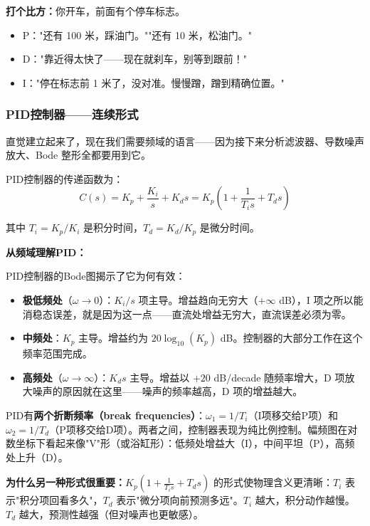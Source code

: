 \textbf{打个比方：}你开车，前面有个停车标志。
\begin{itemize}
    \item P："还有 100 米，踩油门。""还有 10 米，松油门。"
    \item D："靠近得太快了——现在就刹车，别等到跟前！"
    \item I："停在标志前 1 米了，没对准。慢慢蹭，蹭到精确位置。"
\end{itemize}

\subsubsection{PID控制器——连续形式}

直觉建立起来了，现在我们需要频域的语言——因为接下来分析滤波器、导数噪声放大、Bode 整形全都要用到它。

PID控制器的传递函数为：
\begin{equation}
C(s) = K_p + \frac{K_i}{s} + K_d s = K_p \left(1 + \frac{1}{T_i s} + T_d s\right)
\end{equation}

其中 $T_i = K_p / K_i$ 是积分时间，$T_d = K_d / K_p$ 是微分时间。

\textbf{从频域理解PID：}

PID控制器的Bode图揭示了它为何有效：
\begin{itemize}
    \item \textbf{极低频处}（$\omega \to 0$）：$K_i/s$ 项主导。增益趋向无穷大（$+\infty$ dB），I 项之所以能消稳态误差，就是因为这一点——直流处增益无穷大，直流误差必须为零。
    \item \textbf{中频处}：$K_p$ 主导。增益约为 $20\log_{10}(K_p)$ dB。控制器的大部分工作在这个频率范围完成。
    \item \textbf{高频处}（$\omega \to \infty$）：$K_d s$ 主导。增益以 $+20$ dB/decade 随频率增大，D 项放大噪声的原因就在这里——噪声的频率越高，D 项的增益越大。
\end{itemize}

PID有\textbf{两个折断频率（break frequencies）}：$\omega_1 = 1/T_i$（I项移交给P项）和 $\omega_2 = 1/T_d$（P项移交给D项）。两者之间，控制器表现为纯比例控制。幅频图在对数坐标下看起来像"V"形（或浴缸形）：低频处增益大（I），中间平坦（P），高频处上升（D）。

\textbf{为什么另一种形式很重要：}$K_p(1 + \frac{1}{T_i s} + T_d s)$ 的形式使物理含义更清晰：$T_i$ 表示"积分项回看多久"，$T_d$ 表示"微分项向前预测多远"。$T_i$ 越大，积分动作越慢。$T_d$ 越大，预测性越强（但对噪声也更敏感）。

